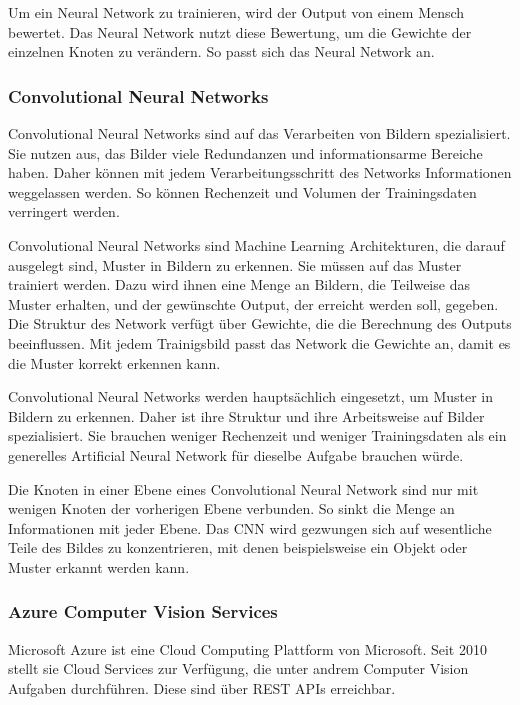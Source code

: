 Um ein Neural Network zu trainieren, wird der Output von einem Mensch bewertet. Das Neural Network nutzt diese Bewertung, um die Gewichte der einzelnen Knoten zu verändern. So passt sich das Neural Network an. \citep{introToCNN,surveyOfDeepLearing}

\subsubsection{Convolutional Neural Networks}
Convolutional Neural Networks sind auf das Verarbeiten von Bildern spezialisiert. Sie nutzen aus, das Bilder viele Redundanzen und informationsarme Bereiche haben. Daher können mit jedem Verarbeitungsschritt des Networks Informationen weggelassen werden. So können Rechenzeit und Volumen der Trainingsdaten verringert werden.\citep{introToCNN,surveyOfDeepLearing,cNNforClass}

Convolutional Neural Networks sind Machine Learning Architekturen, die darauf ausgelegt sind, Muster in Bildern zu erkennen. Sie müssen auf das Muster trainiert werden. Dazu wird ihnen eine Menge an Bildern, die Teilweise das Muster erhalten, und der gewünschte Output, der erreicht werden soll, gegeben. Die Struktur des Network verfügt über Gewichte, die die Berechnung des Outputs beeinflussen. Mit jedem Trainigsbild passt das Network die Gewichte an, damit es die Muster korrekt erkennen kann.\citep{introToCNN,surveyOfDeepLearing}

Convolutional Neural Networks werden hauptsächlich eingesetzt, um Muster in Bildern zu erkennen. Daher ist ihre Struktur und ihre Arbeitsweise auf Bilder spezialisiert. Sie brauchen weniger Rechenzeit und weniger Trainingsdaten als ein generelles Artificial Neural Network für dieselbe Aufgabe brauchen würde.\citep{introToCNN,surveyOfDeepLearing,cNNforClass} 

Die Knoten in einer Ebene eines Convolutional Neural Network sind nur mit wenigen Knoten der vorherigen Ebene verbunden. So sinkt die Menge an Informationen mit jeder Ebene. Das CNN wird gezwungen sich auf wesentliche Teile des Bildes zu konzentrieren, mit denen beispielsweise ein Objekt oder  Muster erkannt werden kann. \citep{introToCNN,surveyOfDeepLearing}

\subsubsection{Azure Computer Vision Services}

Microsoft Azure ist eine Cloud Computing Plattform von Microsoft. Seit 2010 stellt sie Cloud Services zur Verfügung, die unter andrem Computer Vision Aufgaben durchführen. 
Diese sind über REST APIs erreichbar. 

